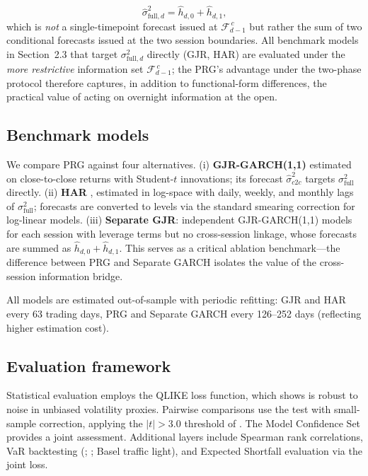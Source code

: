 \documentclass[11pt,a4paper]{article}
\begin{document}
\begin{equation}
    \hat{\sigma}^2_{\text{full},d} = \hat{h}_{d,0} + \hat{h}_{d,1},
    \label{eq:prg_fullday}
\end{equation}
which is \emph{not} a single-timepoint forecast issued at $\mathcal{F}_{d-1}^{\,c}$ but rather the sum of two conditional forecasts issued at the two session boundaries. All benchmark models in Section~2.3 that target $\sigma^2_{\text{full},d}$ directly (GJR, HAR) are evaluated under the \emph{more restrictive} information set $\mathcal{F}_{d-1}^{\,c}$; the PRG's advantage under the two-phase protocol therefore captures, in addition to functional-form differences, the practical value of acting on overnight information at the open.

\subsection{Benchmark models}

We compare PRG against four alternatives. (i) \textbf{GJR-GARCH(1,1)} \citep{Glosten1993} estimated on close-to-close returns with Student-$t$ innovations; its forecast $\hat{\sigma}^2_{c2c}$ targets $\sigma^2_{\text{full}}$ directly. (ii) \textbf{HAR} \citep{Corsi2009}, estimated in log-space with daily, weekly, and monthly lags of $\sigma^2_{\text{full}}$; forecasts are converted to levels via the standard smearing correction for log-linear models. (iii) \textbf{Separate GJR}: independent GJR-GARCH(1,1) models for each session with leverage terms but no cross-session linkage, whose forecasts are summed as $\hat{h}_{d,0} + \hat{h}_{d,1}$. This serves as a critical ablation benchmark---the difference between PRG and Separate GARCH isolates the value of the cross-session information bridge.

All models are estimated out-of-sample with periodic refitting: GJR and HAR every 63 trading days, PRG and Separate GARCH every 126--252 days (reflecting higher estimation cost).

\subsection{Evaluation framework}

Statistical evaluation employs the QLIKE loss function, which \citet{Patton2011} shows is robust to noise in unbiased volatility proxies. Pairwise comparisons use the \citet{Diebold1995} test with \citet{Harvey1997} small-sample correction, applying the $|t| > 3.0$ threshold of \citet{Harvey2016}. The Model Confidence Set \citep{Hansen2011MCS} provides a joint assessment. Additional layers include Spearman rank correlations, VaR backtesting (\citealp{Kupiec1995}; \citealp{Christoffersen1998}; Basel traffic light), and Expected Shortfall evaluation via the \citet{Fissler2016} joint loss.
\end{document}
